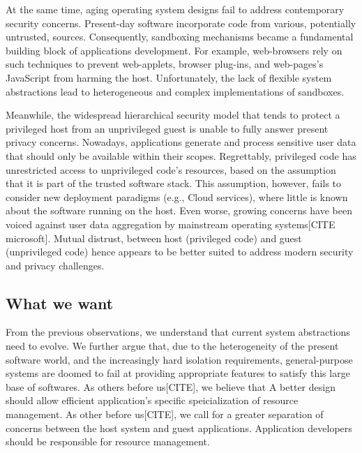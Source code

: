 At the same time, aging operating system designs fail to address contemporary security concerns.
Present-day software incorporate code from various, potentially untrusted, sources.
Consequently, sandboxing mechanisms became a fundamental building block of applications development.
For example, web-browsers rely on such techniques to prevent web-applets, browser plug-ins, and web-pages's JavaScript from harming the host.
Unfortunately, the lack of flexible system abstractions lead to heterogeneous and complex implementations of sandboxes.

Meanwhile, the widespread hierarchical security model that tends to protect a privileged host from an unprivileged guest is unable to fully answer present privacy concerns.
Nowadays, applications generate and process sensitive user data that should only be available within their scopes.
Regrettably, privileged code has unrestricted access to unprivileged code's resources, based on the assumption that it is part of the trusted software stack.
This assumption, however, fails to consider new deployment paradigms (e.g., Cloud services), where little is known about the software running on the host.
Even worse, growing concerns have been voiced against user data aggregation by mainstream operating systems[CITE microsoft].
Mutual distrust, between host (privileged code) and guest (unprivileged code) hence appears to be better suited to address modern security and privacy challenges. 

\subsection{What we want}
From the previous observations, we understand that current system abstractions need to evolve.
We further argue that, due to the heterogeneity of the present software world, and the increasingly hard isolation requirements, general-purpose systems are doomed to fail at providing appropriate features to satisfy this large base of softwares.
As others before us[CITE], we believe that A better design should allow efficient application's specific speicialization of resource management.
As other before us[CITE], we call for a greater separation of concerns between the host system and guest applications.%
Application developers should be responsible for resource management.


